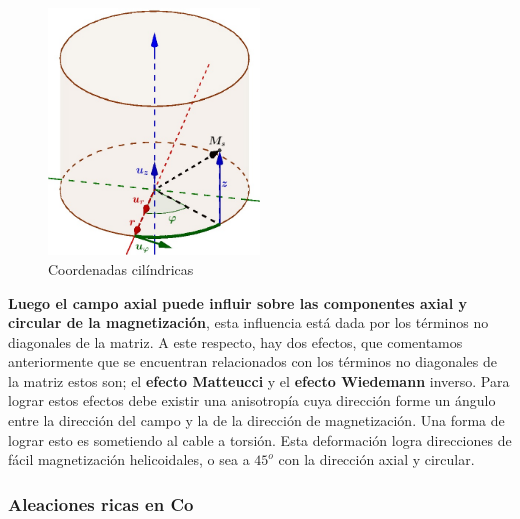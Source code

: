 \begin{figure}[H]
    \centering
    \includegraphics[width=0.5\textwidth]{./Figures/fig314}
	\caption{Coordenadas cilíndricas}
	\label{fig:314}
\end{figure}

\textbf{Luego el campo axial puede influir sobre las componentes axial y circular de la magnetización}, esta influencia está dada por los términos no diagonales de la matriz. A este respecto, hay dos efectos, que comentamos anteriormente que se encuentran relacionados con los términos no diagonales de la matriz estos son; el \textbf{efecto Matteucci} y el \textbf{efecto Wiedemann} inverso. Para lograr estos efectos debe existir una anisotropía cuya dirección forme un ángulo entre la dirección del campo y la de la dirección de magnetización. Una forma de lograr esto es sometiendo al cable a torsión. Esta deformación logra direcciones de fácil magnetización helicoidales, o sea a $45^{o}$ con la dirección axial y circular.


\subsubsection{Aleaciones ricas en Co}

